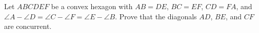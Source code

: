 Let $ABCDEF$ be a convex hexagon with $AB=DE$, $BC=EF$, $CD=FA$, and $\angle{A}-\angle{D}=\angle{C}-\angle{F}=\angle{E}-\angle{B}$. Prove that the diagonals $AD$, $BE$, and $CF$ are concurrent.